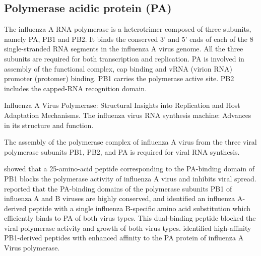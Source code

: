 \subsection{Polymerase acidic protein (PA)}

The influenza A RNA polymerase is a heterotrimer composed of three subunits, namely PA, PB1 and PB2. It binds the conserved 3' and 5' ends of each of the 8 single-stranded RNA segments in the influenza A virus genome. All the three subunits are required for both transcription and replication. PA is involved in assembly of the functional complex, cap binding and vRNA (virion RNA) promoter (protomer) binding. PB1 carries the polymerase active site. PB2 includes the capped-RNA recognition domain.

\citep{1567} Influenza A Virus Polymerase: Structural Insights into Replication and Host Adaptation Mechanisms.%
\citep{1568} The influenza virus RNA synthesis machine: Advances in its structure and function.%

The assembly of the polymerase complex of influenza A virus from the three viral polymerase subunits PB1, PB2, and PA is required for viral RNA synthesis.

\citep{1234} showed that a 25-amino-acid peptide corresponding to the PA-binding domain of PB1 blocks the polymerase activity of influenza A virus and inhibits viral spread.
\citep{1575} reported that the PA-binding domains of the polymerase subunits PB1 of influenza A and B viruses are highly conserved, and identified an influenza A-derived peptide with a single influenza B-specific amino acid substitution which efficiently binds to PA of both virus types. This dual-binding peptide blocked the viral polymerase activity and growth of both virus types.%
\citep{1541} identified high-affinity PB1-derived peptides with enhanced affinity to the PA protein of influenza A Virus polymerase.%

